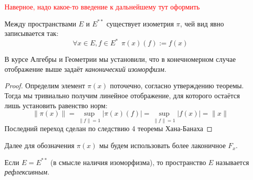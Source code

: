 \textcolor{red}{Наверное, надо какое-то введение к дальнейшему тут оформить}

\begin{theorem}
	Между пространствами $E$ и $E^{**}$ существует изометрия $\pi$, чей вид явно записывается так:
	\[
		\forall x \in E, f \in E^*\ \ \pi(x)(f) := f(x)
	\]
\end{theorem}

\begin{anote}
	В курсе Алгебры и Геометрии мы установили, что в конечномерном случае отображение выше задаёт \textit{канонический изоморфизм}.
\end{anote}

\begin{proof}
	Определим элемент $\pi(x)$ поточечно, согласно утверждению теоремы. Тогда мы тривиально получим линейное отображение, для которого остаётся лишь установить равенство норм:
	\[
		\|\pi(x)\| = \sup_{\|f\| = 1} |\pi(x)(f)| = \sup_{\|f\| = 1} |f(x)| = \|x\|
	\]
	Последний переход сделан по следствию 4 теоремы Хана-Банаха
\end{proof}

\begin{note}
	Далее для обозначения $\pi(x)$ мы будем использовать более лаконичное $F_x$.
\end{note}

\begin{definition}
	Если $E = E^{**}$ (в смысле наличия изоморфизма), то пространство $E$ называется \textit{рефлексивным}.
\end{definition}